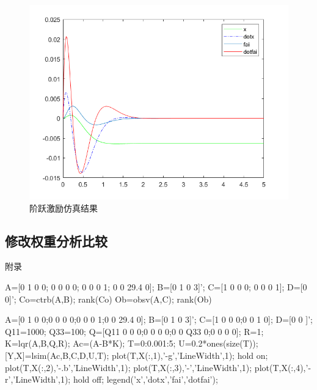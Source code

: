 \documentclass{MathorCupmodeling}
\begin{document}
\begin{figure}[hbpt]
\centering
\includegraphics[width=12cm]{1000_100_2.png}
\caption{阶跃激励仿真结果}\label{1000_100_2}
\end{figure}

\subsection{修改权重分析比较}


\newpage
	\appendix
	\begin{center}
		\heiti{} 附\hspace{1pc}录
	\end{center}

\begin{matlab}
A=[0 1 0 0;
   0 0 0 0;
   0 0 0 1;
   0 0 29.4 0];
B=[0 1 0 3]';
C=[1 0 0 0;
   0 0 0 1];
D=[0 0]';
Co=ctrb(A,B);
rank(Co)
Ob=obsv(A,C);
rank(Ob)
\end{matlab}

\begin{matlab}
A=[0 1 0 0;0 0 0 0;0 0 0 1;0 0 29.4 0];
B=[0 1 0 3]';
C=[1 0 0 0;0 0 1 0];
D=[0 0 ]';
Q11=1000;
Q33=100;%
Q=[Q11 0 0 0;0 0 0 0;0 0 Q33 0;0 0 0 0];
R=1;
K=lqr(A,B,Q,R);
Ac=(A-B*K);
T=0:0.001:5;
U=0.2*ones(size(T));
[Y,X]=lsim(Ac,B,C,D,U,T);%
plot(T,X(:,1),'-g','LineWidth',1);
hold on;
plot(T,X(:,2),'-.b','LineWidth',1);
plot(T,X(:,3),'-','LineWidth',1);
plot(T,X(:,4),'-r','LineWidth',1);
hold off;
legend('x','dotx','fai','dotfai');
\end{matlab}
\end{document}
